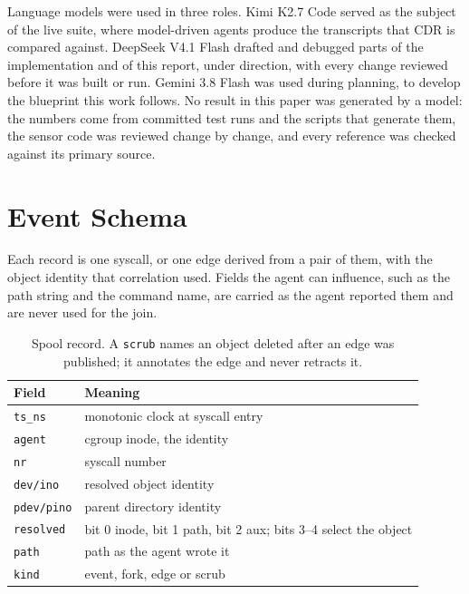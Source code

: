 \documentclass[11pt]{article}
\begin{document}
Language models were used in three roles. Kimi K2.7 Code served as the subject of the
live suite, where model-driven agents produce the transcripts that CDR is compared
against. DeepSeek V4.1 Flash drafted and debugged parts of the implementation and of
this report, under direction, with every change reviewed before it was built or run.
Gemini 3.8 Flash was used during planning, to develop the blueprint this work follows.
No result in this paper was generated by a model: the numbers come from committed test
runs and the scripts that generate them, the sensor code was reviewed change by change,
and every reference was checked against its primary source.




\appendix

\section{Event Schema}

Each record is one syscall, or one edge derived from a pair of them, with the object
identity that correlation used. Fields the agent can influence, such as the path string
and the command name, are carried as the agent reported them and are never used for the
join.

\begin{table}[h]
\centering
\footnotesize
\begin{tabular}{@{}l p{}@{}}
\toprule
Field & Meaning \\
\midrule
\texttt{ts\_ns}     & monotonic clock at syscall entry \\
\texttt{agent}      & cgroup inode, the identity \\
\texttt{nr}         & syscall number \\
\texttt{dev/ino}    & resolved object identity \\
\texttt{pdev/pino}  & parent directory identity \\
\texttt{resolved}   & bit 0 inode, bit 1 path, bit 2 aux; bits 3--4 select the object \\
\texttt{path}       & path as the agent wrote it \\
\texttt{kind}       & event, fork, edge or scrub \\
\bottomrule
\end{tabular}
\caption{Spool record. A \texttt{scrub} names an object deleted after an edge was
published; it annotates the edge and never retracts it.}
\label{tab:schema}
\end{table}
\end{document}
